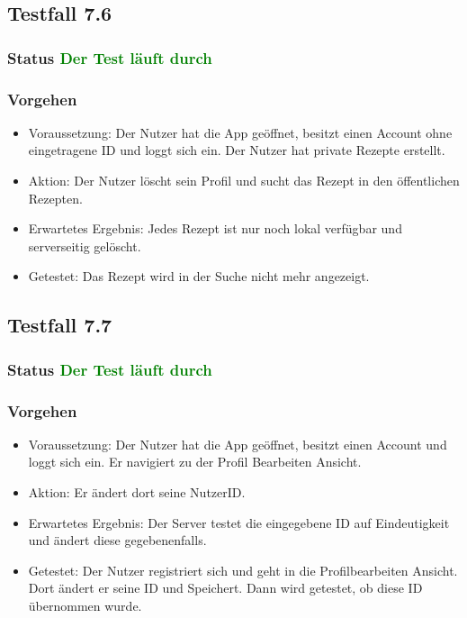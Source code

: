 \subsection{Testfall 7.6}
\subsubsection{Status \textcolor{green}{ Der Test läuft durch}} 
\subsubsection{Vorgehen}
\begin{itemize}
\item Voraussetzung: Der Nutzer hat die App geöffnet, besitzt einen Account ohne eingetragene ID und loggt sich ein. Der Nutzer hat private Rezepte erstellt.
\item Aktion: Der Nutzer löscht sein Profil und sucht das Rezept in den öffentlichen Rezepten. 
\item Erwartetes Ergebnis: Jedes Rezept ist nur noch lokal verfügbar und serverseitig gelöscht. 
\item Getestet:  Das Rezept wird in der Suche nicht mehr angezeigt.
\end{itemize}


\subsection{Testfall 7.7}
\subsubsection{Status \textcolor{green}{ Der Test läuft durch}} 
\subsubsection{Vorgehen}
\begin{itemize}
\item Voraussetzung: Der Nutzer hat die App geöffnet, besitzt einen Account und loggt sich ein. Er navigiert zu der Profil Bearbeiten Ansicht.
\item Aktion: Er ändert dort seine NutzerID.
\item Erwartetes Ergebnis: Der Server testet die eingegebene ID auf Eindeutigkeit und ändert diese gegebenenfalls.
\item Getestet: Der Nutzer registriert sich und geht in die Profilbearbeiten Ansicht. Dort ändert er seine ID und Speichert. Dann wird getestet, ob diese ID übernommen wurde. 
\end{itemize}



